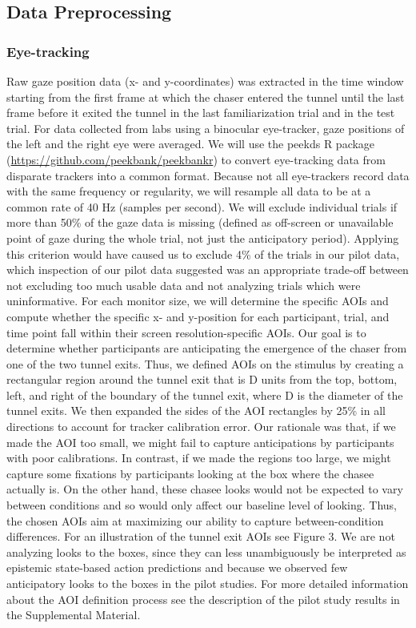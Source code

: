 \documentclass[
  man,floatsintext]{apa6}
\begin{document}
\subsection{Data Preprocessing}\label{data-preprocessing}

\subsubsection{Eye-tracking}\label{eye-tracking}

Raw gaze position data (x- and y-coordinates) was extracted in the time window starting from the first frame at which the chaser entered the tunnel until the last frame before it exited the tunnel in the last familiarization trial and in the test trial. For data collected from labs using a binocular eye-tracker, gaze positions of the left and the right eye were averaged.
We will use the peekds R package (\url{https://github.com/peekbank/peekbankr}) to convert eye-tracking data from disparate trackers into a common format. Because not all eye-trackers record data with the same frequency or regularity, we will resample all data to be at a common rate of 40 Hz (samples per second).
We will exclude individual trials if more than 50\% of the gaze data is missing (defined as off-screen or unavailable point of gaze during the whole trial, not just the anticipatory period). Applying this criterion would have caused us to exclude 4\% of the trials in our pilot data, which inspection of our pilot data suggested was an appropriate trade-off between not excluding too much usable data and not analyzing trials which were uninformative.
For each monitor size, we will determine the specific AOIs and compute whether the specific x- and y-position for each participant, trial, and time point fall within their screen resolution-specific AOIs. Our goal is to determine whether participants are anticipating the emergence of the chaser from one of the two tunnel exits. Thus, we defined AOIs on the stimulus by creating a rectangular region around the tunnel exit that is D units from the top, bottom, left, and right of the boundary of the tunnel exit, where D is the diameter of the tunnel exits. We then expanded the sides of the AOI rectangles by 25\% in all directions to account for tracker calibration error. Our rationale was that, if we made the AOI too small, we might fail to capture anticipations by participants with poor calibrations. In contrast, if we made the regions too large, we might capture some fixations by participants looking at the box where the chasee actually is. On the other hand, these chasee looks would not be expected to vary between conditions and so would only affect our baseline level of looking. Thus, the chosen AOIs aim at maximizing our ability to capture between-condition differences. For an illustration of the tunnel exit AOIs see Figure 3. We are not analyzing looks to the boxes, since they can less unambiguously be interpreted as epistemic state-based action predictions and because we observed few anticipatory looks to the boxes in the pilot studies. For more detailed information about the AOI definition process see the description of the pilot study results in the Supplemental Material.
\end{document}
